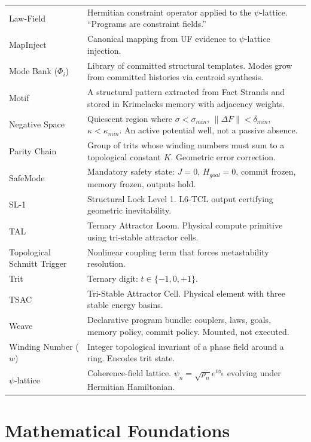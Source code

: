 \documentclass[11pt, a4paper]{report}
\begin{document}
\begin{longtable}{@{}p{4cm}p{10.5cm}@{}}
Law-Field & Hermitian constraint operator applied to the $\psi$-lattice.
            ``Programs are constraint fields.'' \\
MapInject & Canonical mapping from UF evidence to $\psi$-lattice injection. \\
Mode Bank ($\Phi_i$) & Library of committed structural templates. Modes
                       grow from committed histories via centroid synthesis. \\
Motif & A structural pattern extracted from Fact Strands and stored in
        Krimelacks memory with adjacency weights. \\
Negative Space & Quiescent region where $\sigma < \sigma_{min}$,
                 $\|\Delta F\| < \delta_{min}$, $\kappa < \kappa_{min}$.
                 An active potential well, not a passive absence. \\
Parity Chain & Group of trits whose winding numbers must sum to a
               topological constant $K$. Geometric error correction. \\
SafeMode & Mandatory safety state: $J=0$, $H_{goal}=0$, commit frozen,
           memory frozen, outputs hold. \\
SL-1 & Structural Lock Level 1. L6-TCL output certifying geometric
       inevitability. \\
TAL & Ternary Attractor Loom. Physical compute primitive using
      tri-stable attractor cells. \\
Topological Schmitt Trigger & Nonlinear coupling term that forces
                              metastability resolution. \\
Trit & Ternary digit: $t \in \{-1, 0, +1\}$. \\
TSAC & Tri-Stable Attractor Cell. Physical element with three stable
       energy basins. \\
Weave & Declarative program bundle: couplers, laws, goals, memory
        policy, commit policy. Mounted, not executed. \\
Winding Number ($w$) & Integer topological invariant of a phase field
                       around a ring. Encodes trit state. \\
$\psi$-lattice & Coherence-field lattice. $\psi_n = \sqrt{\rho_n} e^{i\phi_n}$
                 evolving under Hermitian Hamiltonian. \\
\bottomrule
\end{longtable}

\chapter{Mathematical Foundations}
\end{document}
